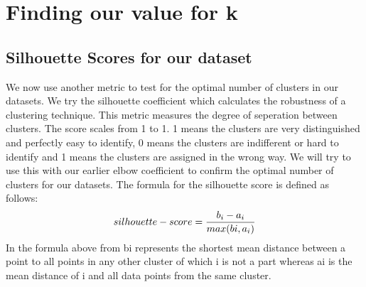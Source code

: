 \documentclass[letterpaper,10pt,english]{jupyterBook}
\begin{document}
\section{Finding our value for k}
\label{\detokenize{clustering:finding-our-value-for-k}}

\subsection{Silhouette Scores for our  dataset}
\label{\detokenize{clustering:silhouette-scores-for-our-dataset}}
\sphinxAtStartPar
We now use another metric to test for the optimal number of clusters in our datasets. We try the silhouette coefficient which calculates the robustness of a clustering technique. This metric measures the degree of seperation between clusters. The score scales from \sphinxhyphen{}1 to 1. 1 means the clusters are very distinguished and perfectly easy to identify, 0 means the clusters are indifferent or hard to identify and \sphinxhyphen{}1 means the clusters are assigned in the wrong way. We will try to use this with our earlier elbow coefficient to confirm the optimal number of clusters for our datasets. The formula for the silhouette score is defined as follows:
\begin{equation*}
\begin{split}
 silhouette - score = {b_{i} - a_{i} \over max(bi, a_{i})} \\
\end{split}
\end{equation*}
\sphinxAtStartPar
In the formula above from  bi represents the shortest mean distance between a point to all points in any other cluster of which i is not a part whereas ai is the mean distance of i and all data points from the same cluster.

\begin{sphinxVerbatim}[commandchars=\\\{\}]
   
\end{sphinxVerbatim}
\end{document}
